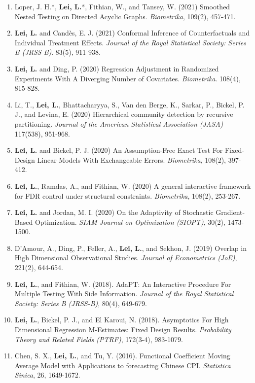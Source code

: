 \documentclass{article}
\begin{document}
\begin{enumerate}
\item Loper, J. H.*, \textbf{Lei, L.}*, Fithian, W., and Tansey, W. (2021) Smoothed Nested Testing on Directed Acyclic Graphs. \emph{Biometrika}, 109(2), 457-471.
\item \textbf{Lei, L.} and Cand\`{e}s, E. J. (2021) Conformal Inference of Counterfactuals and Individual Treatment Effects. \emph{Journal of the Royal Statistical Society: Series B (JRSS-B)}. 83(5), 911-938.
\item \textbf{Lei, L.} and Ding, P. (2020) Regression Adjustment in Randomized Experiments With A Diverging Number of Covariates. \emph{Biometrika}. 108(4), 815-828.
\item Li, T., \textbf{Lei, L.}, Bhattacharyya, S., Van den Berge, K., Sarkar, P., Bickel, P. J., and Levina, E. (2020) Hierarchical community detection by recursive partitioning. \emph{Journal of the American Statistical Association (JASA)} 117(538), 951-968.
\item \textbf{Lei, L.} and Bickel, P. J. (2020) An Assumption-Free Exact Test For Fixed-Design Linear Models With Exchangeable Errors. \emph{Biometrika}, 108(2), 397-412.
\item \textbf{Lei, L.}, Ramdas, A., and Fithian, W. (2020) A general interactive framework for FDR control under structural constraints. \emph{Biometrika}, 108(2), 253-267.
\item \textbf{Lei, L.} and Jordan, M. I. (2020) On the Adaptivity of Stochastic Gradient-Based Optimization. \emph{SIAM Journal on Optimization (SIOPT)}, 30(2), 1473-1500.
\item D'Amour, A., Ding, P., Feller, A., \textbf{Lei, L.}, and Sekhon, J. (2019) Overlap in High Dimensional Observational Studies. \emph{Journal of Econometrics (JoE)}, 221(2), 644-654.
\item \textbf{Lei, L.}, and Fithian, W. (2018). AdaPT: An Interactive Procedure For Multiple Testing With Side Information. \emph{Journal of the Royal Statistical Society: Series B (JRSS-B)}, 80(4), 649-679.
\item \textbf{Lei, L.}, Bickel, P. J., and El Karoui, N. (2018). Asymptotics For High Dimensional Regression M-Estimates: Fixed Design Results. \emph{Probability Theory and Related Fields (PTRF)}, 172(3-4), 983-1079.
\item Chen, S. X., \textbf{Lei, L.}, and Tu, Y. (2016). Functional Coefficient Moving Average Model with Applications to forecasting Chinese CPI. \emph{Statistica Sinica}, 26, 1649-1672.
\end{enumerate}
\end{document}
